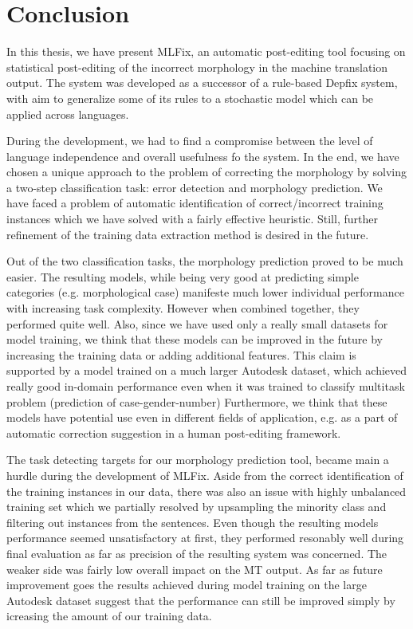 \chapter{Conclusion}

In this thesis, we have present MLFix, an automatic post-editing tool focusing on statistical
post-editing of the incorrect morphology in the machine translation output. The system was
developed as a successor of a rule-based Depfix system, with aim to generalize some of its
rules to a stochastic model which can be applied across languages.

During the development, we had to find a compromise between the level of language independence
and overall usefulness fo the system. In the end, we have chosen a unique approach to the problem of correcting
the morphology by solving a two-step classification task: error detection and morphology prediction.
We have faced a problem of automatic identification of correct/incorrect training instances
which we have solved with a fairly effective heuristic. Still, further refinement of the
training data extraction method is desired in the future.

Out of the two classification tasks, the morphology prediction proved to be much easier.
The resulting models, while being very good at predicting simple categories (e.g. morphological case)
manifeste much lower individual performance with increasing task complexity. However when
combined together, they performed quite well.
Also, since we have used only a really small datasets for model training, we think that these models
can be improved in the future by increasing the training data or adding additional features.
This claim is supported by a model trained on a much larger Autodesk dataset, which achieved really good
in-domain performance even when it was trained to classify multitask problem (prediction of case-gender-number)
Furthermore, we think that
these models have potential use even in different fields of application, e.g. as a part of automatic
correction suggestion in a human post-editing framework.

The task detecting targets for our morphology prediction tool, became main a hurdle
during the development of MLFix. Aside from the correct identification of the training instances
in our data, there was also an issue with highly unbalanced training set which we partially resolved
by upsampling the minority class and filtering out instances from the  sentences.
Even though the resulting models performance seemed unsatisfactory at first, they performed resonably
well during final evaluation as far as precision of the resulting system was concerned. The weaker
side was fairly low overall impact on the MT output. As far as future improvement goes the results
achieved during model training on the large Autodesk dataset suggest that the performance can still be
improved simply by icreasing the amount of our training data.

